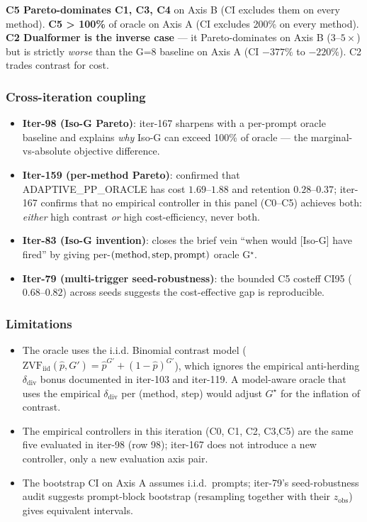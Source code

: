 \documentclass{article}
\begin{document}
\textbf{C5 Pareto-dominates C1, C3, C4} on Axis B (CI excludes them on every
method). \textbf{C5 > 100\%} of oracle on Axis A (CI excludes 200\% on every
method). \textbf{C2 Dualformer is the inverse case} --- it Pareto-dominates
on Axis B ($3$--$5\times$) but is strictly \emph{worse} than the G=8 baseline
on Axis A (CI $-377\%$ to $-220\%$). C2 trades contrast for cost.

\subsubsection*{Cross-iteration coupling}

\begin{itemize}
\item \textbf{Iter-98 (Iso-G Pareto)}: iter-167 sharpens with a per-prompt
      oracle baseline and explains \emph{why} Iso-G can exceed 100\% of
      oracle --- the marginal-vs-absolute objective difference.
\item \textbf{Iter-159 (per-method Pareto)}: confirmed that ADAPTIVE\_PP\_ORACLE
      has cost $1.69$--$1.88$ and retention $0.28$--$0.37$; iter-167 confirms
      that no empirical controller in this panel (C0--C5) achieves both:
      \emph{either} high contrast \emph{or} high cost-efficiency, never both.
\item \textbf{Iter-83 (Iso-G invention)}: closes the brief vein
      ``when would [Iso-G] have fired'' by giving per-$({\rm method},
      {\rm step}, {\rm prompt})$ oracle G$^\star$.
\item \textbf{Iter-79 (multi-trigger seed-robustness)}: the bounded C5
      costeff CI95 ($0.68$--$0.82$) across seeds suggests the
      cost-effective gap is reproducible.
\end{itemize}

\subsubsection*{Limitations}

\begin{itemize}
\item The oracle uses the i.i.d. Binomial contrast model
      ($\mathrm{ZVF}_{\mathrm{iid}}(\hat p, G') = \hat p^{G'} + (1-\hat p)^{G'}$),
      which ignores the empirical anti-herding $\delta_{\mathrm{div}}$
      bonus documented in iter-103 and iter-119. A model-aware oracle that
      uses the empirical $\delta_{\mathrm{div}}$ per (method, step) would
      adjust $G^\star$ for the inflation of contrast.
\item The empirical controllers in this iteration (C0, C1, C2, C3,C5) are the
      same five evaluated in iter-98 (row 98); iter-167 does not
      introduce a new controller, only a new evaluation axis pair.
\item The bootstrap CI on Axis A assumes i.i.d.\ prompts; iter-79's
      seed-robustness audit suggests prompt-block bootstrap (resampling
      together with their $z_{\mathrm{obs}}$) gives equivalent intervals.
\end{itemize}
\end{document}
